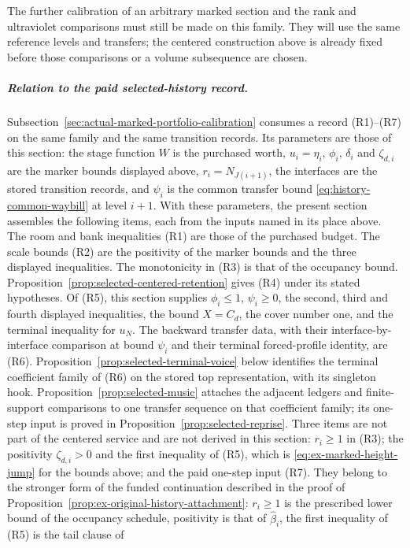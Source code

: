 The further calibration of an arbitrary marked section and the
rank and ultraviolet comparisons must still be made on this family.
They will use the same reference levels and transfers; the centered
construction above is already fixed before those comparisons or a
volume subsequence are chosen.

\subparagraph{Relation to the paid selected-history record.}
Subsection~\ref{sec:actual-marked-portfolio-calibration} consumes a record
(R1)--(R7) on the same family and the same transition records. Its
parameters are those of this section: the stage function $W$ is the
purchased worth, $u_i=\eta_i$, $\phi_i$, $\delta_i$ and $\zeta_{d,i}$
are the marker bounds displayed above, $r_i=N_{J(i+1)}$, the interfaces are
the stored transition records, and $\psi_i$ is the common transfer bound
\eqref{eq:history-common-waybill} at level $i+1$. With these
parameters, the present section assembles the following items, each from
the inputs named in its place above. The room and bank inequalities (R1)
are those of the purchased budget. The scale bounds (R2) are the
positivity of the marker bounds and the three displayed inequalities.
The monotonicity in (R3) is that of the occupancy bound. Proposition~\ref{prop:selected-centered-retention} gives (R4) under
its stated hypotheses. Of (R5), this section supplies $\phi_i\le1$,
$\psi_i\ge0$, the second, third and fourth displayed inequalities, the
bound $X=C_d$, the cover number one, and the terminal inequality for
$u_N$. The backward transfer data, with their interface-by-interface comparison at
bound $\psi_i$ and their terminal forced-profile identity, are (R6).
Proposition~\ref{prop:selected-terminal-voice} below identifies the
terminal coefficient family of (R6) on the stored top representation, with its
singleton hook. Proposition~\ref{prop:selected-music} attaches the
adjacent ledgers and finite-support comparisons to one transfer sequence on that coefficient family;
its one-step input is proved in Proposition~\ref{prop:selected-reprise}.
Three items are not part of the centered service and are not derived in
this section: $r_i\ge1$ in (R3); the positivity $\zeta_{d,i}>0$ and the
first inequality of (R5), which is
\eqref{eq:ex-marked-height-jump} for the bounds above; and the paid
one-step input (R7). They belong to the stronger form of the funded
continuation described in the proof of
Proposition~\ref{prop:ex-original-history-attachment}: $r_i\ge1$ is the
prescribed lower bound of the occupancy schedule, positivity is that of
$\widehat\beta_i$, the first inequality of (R5) is the tail clause of
